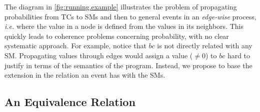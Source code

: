 \documentclass[a4paper]{article}
\begin{document}
The diagram in \cref{fig:running.example} illustrates the problem of
propagating probabilities from \aclp{TC} to \aclp{SM} and then to
general events in an \emph{edge-wise} process, \emph{i.e.} where the
value in a node is defined from the values in its neighbors.  This
quickly leads to coherence problems concerning probability, with no
clear systematic approach.  For example, notice that \(bc\) is not
directly related with any \acl{SM}.  Propagating values through edges
would assign a value (\(\not= 0\)) to \(bc\) hard to justify in terms
of the semantics of the program.  Instead, we propose to base the
extension in the relation an event has with the \aclp{SM}.
%
%
%
\subsection{An Equivalence Relation}
\label{subsec:equivalence.relation}
%
%
%
\end{document}
